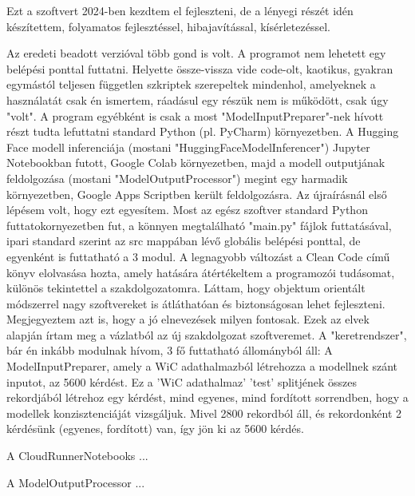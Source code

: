 \usepackage{graphicx}\begin{Document}
                         Ezt a szoftvert 2024-ben kezdtem el fejleszteni, de a lényegi részét idén készítettem, folyamatos fejlesztéssel, hibajavítással, kísérletezéssel.


                         Az eredeti beadott verzióval több gond is volt. A programot nem lehetett egy belépési ponttal futtatni. Helyette össze-vissza vide code-olt, kaotikus, gyakran egymástól teljesen független szkriptek szerepeltek mindenhol, amelyeknek a használatát csak én ismertem, ráadásul egy részük nem is működött, csak úgy "volt". A program egyébként is csak a most "ModelInputPreparer"-nek hívott részt tudta lefuttatni standard Python (pl. PyCharm) környezetben. A Hugging Face modell inferenciája (mostani "HuggingFaceModelInferencer") Jupyter Notebookban futott, Google Colab környezetben, majd a modell outputjának feldolgozása (mostani "ModelOutputProcessor") megint egy harmadik környezetben, Google Apps Scriptben került feldolgozásra.
                         Az újraírásnál első lépésem volt, hogy ezt egyesítem. Most az egész szoftver standard Python futtatokornyezetben fut, a könnyen megtalálható "main.py" fájlok futtatásával, ipari standard szerint az src mappában lévő globális belépési ponttal, de egyenként is futtatható a 3 modul.
                         A legnagyobb változást a Clean Code című könyv elolvasása hozta, amely hatására átértékeltem a programozói tudásomat, különös tekintettel a szakdolgozatomra. Láttam, hogy objektum orientált módszerrel nagy szoftvereket is átláthatóan és biztonságosan lehet fejleszteni. Megjegyeztem azt is, hogy a jó elnevezések milyen fontosak. Ezek az elvek alapján írtam meg a vázlatból az új szakdolgozat szoftveremet.
                         A "keretrendszer", bár én inkább modulnak hívom, 3 fő futtatható állományból áll:
                         A ModelInputPreparer, amely a WiC adathalmazból létrehozza a modellnek szánt inputot, az 5600 kérdést. Ez a 'WiC adathalmaz' 'test' splitjének összes rekordjából létrehoz egy kérdést, mind egyenes, mind fordított sorrendben, hogy a modellek konzisztenciáját vizsgáljuk. Mivel 2800 rekordból áll, és rekordonként 2 kérdésünk (egyenes, fordított) van, így jön ki az 5600 kérdés.

                         A CloudRunnerNotebooks ...


                         A ModelOutputProcessor ...



\end{Document}
